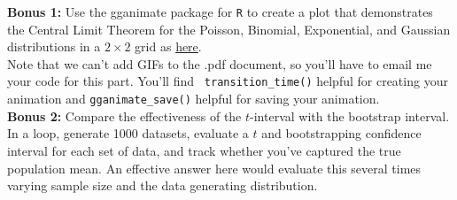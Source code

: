 \documentclass{article}\usepackage[]{graphicx}\usepackage[]{color}
\begin{document}
\newpage
\noindent \textbf{Bonus 1:} Use the gganimate package \citep{gganimate} for \texttt{R} to create a plot that demonstrates the Central Limit Theorem for the Poisson, Binomial, Exponential, and Gaussian distributions in a $2\times 2$ grid as \href{https://moodle.colgate.edu/mod/forum/discuss.php?d=127682}{here}.\\

Note that we can't add GIFs to the .pdf document, so you'll have to email me your code for this part. You'll find \texttt{  transition\_time()} helpful for creating your animation and \texttt{gganimate\_save()} helpful for saving your animation. \vspace{2em}\\


\noindent \textbf{Bonus 2:} Compare the effectiveness of the $t$-interval with the bootstrap interval. In a loop, generate 1000 datasets, evaluate a $t$ and bootstrapping confidence interval for each set of data, and track whether you've captured the true population mean. An effective answer here would evaluate this several times varying sample size and the data generating distribution.

\newpage

\end{document}
